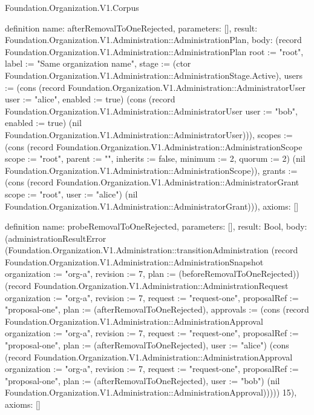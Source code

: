 \begin{lexlean}{Foundation.Organization.V1.Corpus}
\begin{semanticmodule}
definition{
  name: afterRemovalToOneRejected,
  parameters: [],
  result: Foundation.Organization.V1.Administration::AdministrationPlan,
  body: (record Foundation.Organization.V1.Administration::AdministrationPlan {root := "root", label := "Same organization name", stage := (ctor Foundation.Organization.V1.Administration::AdministrationStage.Active), users := (cons (record Foundation.Organization.V1.Administration::AdministratorUser {user := "alice", enabled := true}) (cons (record Foundation.Organization.V1.Administration::AdministratorUser {user := "bob", enabled := true}) (nil Foundation.Organization.V1.Administration::AdministratorUser))), scopes := (cons (record Foundation.Organization.V1.Administration::AdministrationScope {scope := "root", parent := "", inherits := false, minimum := 2, quorum := 2}) (nil Foundation.Organization.V1.Administration::AdministrationScope)), grants := (cons (record Foundation.Organization.V1.Administration::AdministratorGrant {scope := "root", user := "alice"}) (nil Foundation.Organization.V1.Administration::AdministratorGrant))}),
  axioms: []
}

definition{
  name: probeRemovalToOneRejected,
  parameters: [],
  result: Bool,
  body: (administrationResultError (Foundation.Organization.V1.Administration::transitionAdministration (record Foundation.Organization.V1.Administration::AdministrationSnapshot {organization := "org-a", revision := 7, plan := (beforeRemovalToOneRejected)}) (record Foundation.Organization.V1.Administration::AdministrationRequest {organization := "org-a", revision := 7, request := "request-one", proposalRef := "proposal-one", plan := (afterRemovalToOneRejected), approvals := (cons (record Foundation.Organization.V1.Administration::AdministrationApproval {organization := "org-a", revision := 7, request := "request-one", proposalRef := "proposal-one", plan := (afterRemovalToOneRejected), user := "alice"}) (cons (record Foundation.Organization.V1.Administration::AdministrationApproval {organization := "org-a", revision := 7, request := "request-one", proposalRef := "proposal-one", plan := (afterRemovalToOneRejected), user := "bob"}) (nil Foundation.Organization.V1.Administration::AdministrationApproval)))})) 15),
  axioms: []
}


\end{semanticmodule}
\end{lexlean}
